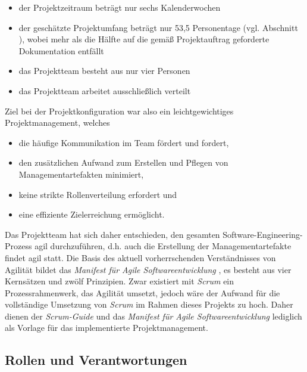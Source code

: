 \documentclass[a4paper,11pt,listof=numbered,glossary=totoc,parskip=half,toc=bib]{scrreprt}
\begin{document}
{\begin{itemize}
	\item der Projektzeitraum beträgt nur sechs Kalenderwochen
	\item der geschätzte Projektumfang beträgt nur 53,5 Personentage (vgl. Abschnitt ), wobei mehr als die Hälfte auf die gemäß Projektauftrag geforderte Dokumentation entfällt
	\item das Projektteam besteht aus nur vier Personen
	\item das Projektteam arbeitet ausschließlich verteilt
\end{itemize}

Ziel bei der Projektkonfiguration war also ein leichtgewichtiges Projektmanagement, welches
\begin{itemize}
	\item die häufige Kommunikation im Team fördert und fordert,
	\item den zusätzlichen Aufwand zum Erstellen und Pflegen von Managementartefakten minimiert,
	\item keine strikte Rollenverteilung erfordert und
	\item eine effiziente Zielerreichung ermöglicht.
\end{itemize}

Das Projektteam hat sich daher entschieden, den gesamten Software-Engineering-Prozess agil durchzuführen, d.h. auch die Erstellung der Managementartefakte findet agil statt. 
Die Basis des aktuell vorherrschenden Verständnisses von Agilität bildet das \textit{Manifest für Agile Softwareentwicklung} \autocite{Agile}, es besteht aus vier Kernsätzen und zwölf Prinzipien. Zwar existiert mit \textit{Scrum} ein Prozessrahmenwerk, das Agilität umsetzt, jedoch wäre der Aufwand für die vollständige Umsetzung von \textit{Scrum} im Rahmen dieses Projekts zu hoch. Daher dienen der \textit{Scrum-Guide} \autocite{Scrum} und das \textit{Manifest für Agile Softwareentwicklung} lediglich als Vorlage für das implementierte Projektmanagement.


\subsection{Rollen und Verantwortungen}

}
\end{document}
